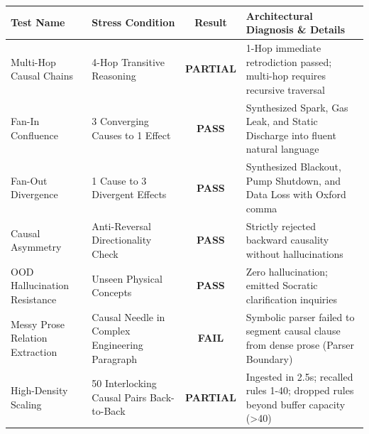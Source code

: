 {\footnotesize\sffamily
{}
\noindent\begin{tabularx}{\textwidth}{p{3.8cm} p{3.5cm} c X}
\toprule
\textbf{\color{brandnavy}Test Name} & \textbf{\color{brandnavy}Stress Condition} & \textbf{\color{brandnavy}Result} & \textbf{\color{brandnavy}Architectural Diagnosis \& Details} \\
\midrule
Multi-Hop Causal Chains & 4-Hop Transitive Reasoning & \textbf{\color{darkslate}PARTIAL} & 1-Hop immediate retrodiction passed; multi-hop requires recursive traversal \\
Fan-In Confluence & 3 Converging Causes to 1 Effect & \textbf{\color{passgreen}PASS} & Synthesized Spark, Gas Leak, and Static Discharge into fluent natural language \\
Fan-Out Divergence & 1 Cause to 3 Divergent Effects & \textbf{\color{passgreen}PASS} & Synthesized Blackout, Pump Shutdown, and Data Loss with Oxford comma \\
Causal Asymmetry & Anti-Reversal Directionality Check & \textbf{\color{passgreen}PASS} & Strictly rejected backward causality without hallucinations \\
OOD Hallucination Resistance & Unseen Physical Concepts & \textbf{\color{passgreen}PASS} & Zero hallucination; emitted Socratic clarification inquiries \\
Messy Prose Relation Extraction & Causal Needle in Complex Engineering Paragraph & \textbf{\color{red}FAIL} & Symbolic parser failed to segment causal clause from dense prose (Parser Boundary) \\
High-Density Scaling & 50 Interlocking Causal Pairs Back-to-Back & \textbf{\color{darkslate}PARTIAL} & Ingested in 2.5s; recalled rules 1-40; dropped rules beyond buffer capacity (\textgreater{}40) \\
\bottomrule
\end{tabularx}
\vspace{0.2em}
}

\vspace{0.6em}
\vspace{0.2em}
